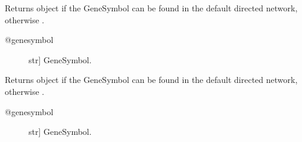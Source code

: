 \documentclass[letterpaper,10pt,english]{sphinxmanual}
\begin{document}
\begin{fulllineitems}
\begin{fulllineitems}
\label{\detokenize{main:pypath.main.PyPath.delete_unmapped}}
\end{fulllineitems}


\begin{fulllineitems}
\label{\detokenize{main:pypath.main.PyPath.dgenesymbol}}
Returns  object if the GeneSymbol
can be found in the default directed network,
otherwise .
\begin{description}
\item[{@genesymbol}] \leavevmode{[}str{]}
GeneSymbol.

\end{description}

\end{fulllineitems}


\begin{fulllineitems}
\label{\detokenize{main:pypath.main.PyPath.dgenesymbols}}
\end{fulllineitems}


\begin{fulllineitems}
\label{\detokenize{main:pypath.main.PyPath.dgs}}
Returns  object if the GeneSymbol
can be found in the default directed network,
otherwise .
\begin{description}
\item[{@genesymbol}] \leavevmode{[}str{]}
GeneSymbol.

\end{description}

\end{fulllineitems}


\begin{fulllineitems}
\label{\detokenize{main:pypath.main.PyPath.dgss}}
\end{fulllineitems}


\end{fulllineitems}
\end{document}
